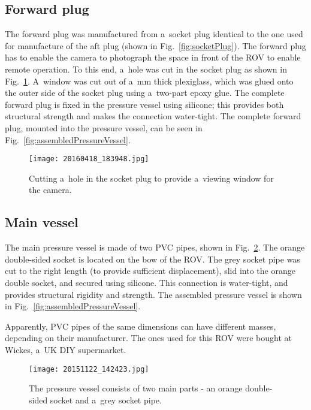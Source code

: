 \subsection{Forward plug}\label{ssection:forwardPlug}
The forward plug was manufactured from a~socket plug identical to the one used for manufacture of the aft plug (shown in Fig.~\ref{fig:socketPlug}). The forward plug has to enable the camera to photograph the space in front of the ROV to enable remote operation. To this end, a~hole was cut in the socket plug as shown in Fig.~\ref{fig:cuttingAHole}. A~window was cut out of a~\unit[4]{mm} thick plexiglass, which was glued onto the outer side of the socket plug using a~two-part epoxy glue. The complete forward plug is fixed in the pressure vessel using silicone; this provides both structural strength and makes the connection water-tight. The complete forward plug, mounted into the pressure vessel, can be seen in Fig.~\ref{fig:assembledPressureVessel}.

\begin{figure}[htb]
\begin{minipage}[b]{1\linewidth}
  \centering
	\texttt{[image: 20160418\_183948.jpg]}
\end{minipage}
\caption{Cutting a~hole in the socket plug to provide a~viewing window for the camera.}
\label{fig:cuttingAHole}
\end{figure}

\subsection{Main vessel}
The main pressure vessel is made of two PVC pipes, shown in Fig.~\ref{fig:pressureVesselPipes}. The orange double-sided socket is located on the bow of the ROV. The grey socket pipe was cut to the right length (to provide sufficient displacement), slid into the orange double socket, and secured using silicone. This connection is water-tight, and provides structural rigidity and strength. The assembled pressure vessel is shown in Fig.~\ref{fig:assembledPressureVessel}.

Apparently, PVC pipes of the same dimensions can have different masses, depending on their manufacturer. The ones used for this ROV were bought at Wickes, a~UK DIY supermarket.

\begin{figure}[htb]
\begin{minipage}[b]{1\linewidth}
  \centering
	\texttt{[image: 20151122\_142423.jpg]}
\end{minipage}
\caption{The pressure vessel consists of two main parts - an orange double-sided socket and a~grey socket pipe.}
\label{fig:pressureVesselPipes}
\end{figure}

